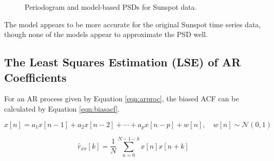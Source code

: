 \begin{figure}[H]
    \centering
    \caption{Periodogram and model-based PSDs for Sunspot data.}
    \label{fig:sunmodels}
\end{figure}

\noindent
The model appears to be more accurate for the original Sunspot time series data, though none of the models appear to approximate the PSD well.

\subsection{The Least Squares Estimation (LSE) of AR Coefficients}

For an AR process given by Equation \ref{eqn:arproc}, the biased ACF can be calculated by Equation \ref{eqn:biasacf}.

\begin{equation}
x[n]=a_{1} x[n-1]+a_{2} x[n-2]+\cdots+a_{p} x[n-p]+w[n], \quad w[n] \sim \mathcal{N}(0,1)
\label{eqn:arproc}
\end{equation}

\begin{equation}
\hat{r}_{x x}[k]=\frac{1}{N} \sum_{n=0}^{N-1-k} x[n] x[n+k]
\label{eqn:biasacf}
\end{equation}

